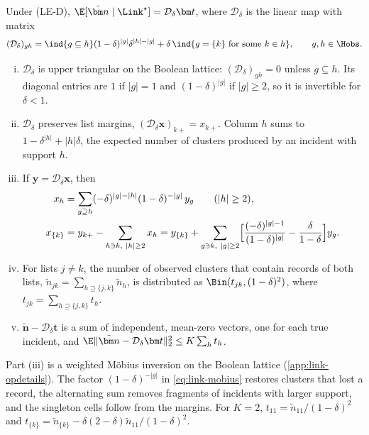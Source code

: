 \begin{proposition}\label{prop:link-detach}
Under (LE-D), $\E[\tilde{\bm n}\mid\Link^\star]=\mathcal D_\delta\bm t$, where $\mathcal D_\delta$ is the linear map with matrix
\begin{equation}\label{eq:link-D}
  (\mathcal D_\delta)_{gh}=\ind{g\subseteq h}(1-\delta)^{|g|}\delta^{|h|-|g|}+\delta\,\ind{g=\{k\}\text{ for some }k\in h},\qquad g,h\in\Hobs .
\end{equation}
\begin{enumerate}[(i)]
  \item $\mathcal D_\delta$ is upper triangular on the Boolean lattice: $(\mathcal D_\delta)_{gh}=0$ unless $g\subseteq h$. Its diagonal entries are $1$ if $|g|=1$ and $(1-\delta)^{|g|}$ if $|g|\ge2$, so it is invertible for $\delta<1$.
  \item $\mathcal D_\delta$ preserves list margins, $(\mathcal D_\delta\bm x)_{k+}=x_{k+}$. Column $h$ sums to $1-\delta^{|h|}+|h|\delta$, the expected number of clusters produced by an incident with support $h$.
  \item If $\bm y=\mathcal D_\delta\bm x$, then
  \begin{align}
    x_h&=\sum_{g\supseteq h}(-\delta)^{|g|-|h|}(1-\delta)^{-|g|}\,y_g\qquad(|h|\ge2),\label{eq:link-mobius}\\
    x_{\{k\}}&=y_{k+}-\sum_{h\ni k,\ |h|\ge2}x_h
    =y_{\{k\}}+\sum_{g\ni k,\ |g|\ge2}\Bigl[\frac{(-\delta)^{|g|-1}}{(1-\delta)^{|g|}}-\frac{\delta}{1-\delta}\Bigr]y_g .\label{eq:link-singleinv}
  \end{align}
  \item For lists $j\neq k$, the number of observed clusters that contain records of both lists, $\tilde n_{jk}=\sum_{h\supseteq\{j,k\}}\tilde n_h$, is distributed as $\Bin(t_{jk},(1-\delta)^2)$, where $t_{jk}=\sum_{h\supseteq\{j,k\}}t_h$.
  \item $\tilde{\bm n}-\mathcal D_\delta\bm t$ is a sum of independent, mean-zero vectors, one for each true incident, and $\E\|\tilde{\bm n}-\mathcal D_\delta\bm t\|_2^2\le K\sum_h t_h$.
\end{enumerate}
\end{proposition}

Part (iii) is a weighted Möbius inversion on the Boolean lattice (\cref{app:link-opdetails}). The factor $(1-\delta)^{-|g|}$ in \eqref{eq:link-mobius} restores clusters that lost a record, the alternating sum removes fragments of incidents with larger support, and the singleton cells follow from the margins. For $K=2$, $t_{11}=\tilde n_{11}/(1-\delta)^2$ and $t_{\{k\}}=\tilde n_{\{k\}}-\delta(2-\delta)\tilde n_{11}/(1-\delta)^2$.

